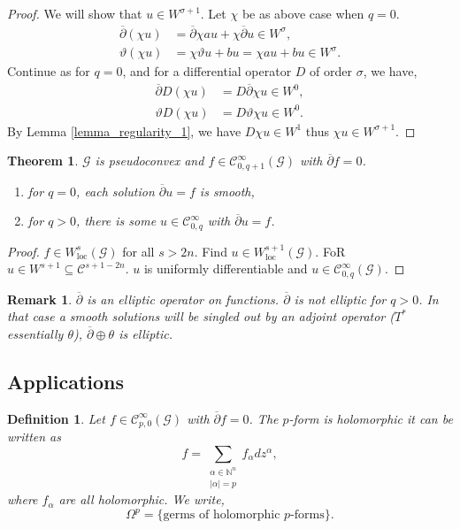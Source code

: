 \documentclass{article}
\newtheorem{theorem}{Theorem} [section]
\newtheorem{definition}{Definition}[section]
\newtheorem{remark}{Remark}[section]
\DeclareMathOperator{\loc}{loc}
\newcommand{\N}[0]{\mathbb{N}}
\newcommand{\G}[0]{\mathcal{G}}
\newcommand{\cbd}[0]{\overline{\partial}}
\newcommand{\ck}[1]{\mathcal{C}^{#1}}
\newcommand{\cinf}[0]{\ck{\infty}}
\begin{document}
\begin{proof}
  We will show that $u\in W^{\sigma+1}$. Let $\chi$ be as above case when $q=0$.
  \begin{align*}
    \overline{\partial}(\chi u)& = \overline{\partial}\chi au + \chi\overline{\partial}u\in W^\sigma,\\
    \vartheta(\chi u) & = \chi\vartheta u +bu = \chi au+bu\in W^\sigma.
  \end{align*} 
  Continue as for $q=0$, and for a differential operator $D$ of order $\sigma$, we have,
  \begin{align*}
    \overline{\partial}D(\chi u) &= D\overline{\partial}\chi u\in W^0,\\
    \vartheta D(\chi u) & = D\vartheta \chi u \in W^0.
  \end{align*}
  By Lemma \ref{lemma_regularity_1}, we have $D\chi u\in W^1$ thus $\chi u\in W^{\sigma+1}$.
\end{proof}
\begin{theorem}
  $\G$ is pseudoconvex and $f\in\cinf_{0,q+1}(\G)$ with $\overline{\partial}f=0$.
  \begin{enumerate}[1).]
    \item for $q=0$, each solution $\overline{\partial}u=f$ is smooth,
    \item for $q>0$, there is some $u\in \cinf_{0,q}$ with $\overline{\partial}u=f$.
  \end{enumerate}
\end{theorem}
\begin{proof}
  $f\in W^s_{\loc}(\G)$ for all $s>2n$. Find $u\in W^{s+1}_{\loc}(\G)$. FoR $u\in W^{s+1}\subseteq\mathcal{C}^{s+1-2n}$. $u$ is uniformly differentiable and $u\in\cinf_{0,q}(\G)$. 
\end{proof}
\begin{remark}
  $\overline{\partial}$ is an elliptic operator on functions. $\overline{\partial}$ is not elliptic for $q>0$. In that case a smooth solutions will be singled out by an adjoint operator ($T^*$ essentially $\theta$), $\overline{\partial}\oplus\theta$ is elliptic.
\end{remark}
\subsection{Applications}

\begin{definition}
  Let $f\in \cinf_{p,0}(\G)$ with $\cbd f=0$. The $p$-form is holomorphic it can be written as
  \begin{equation*}
    f = \sum_{\substack{\alpha\in\N^n\\\vert\alpha\vert = p}}f_\alpha dz^\alpha,
  \end{equation*}
  where $f_\alpha$ are all holomorphic. We write,
  \begin{equation*}
    \Omega^p = \{\text{germs of holomorphic $p$-forms}\}.
  \end{equation*}
\end{definition}
\end{document}

